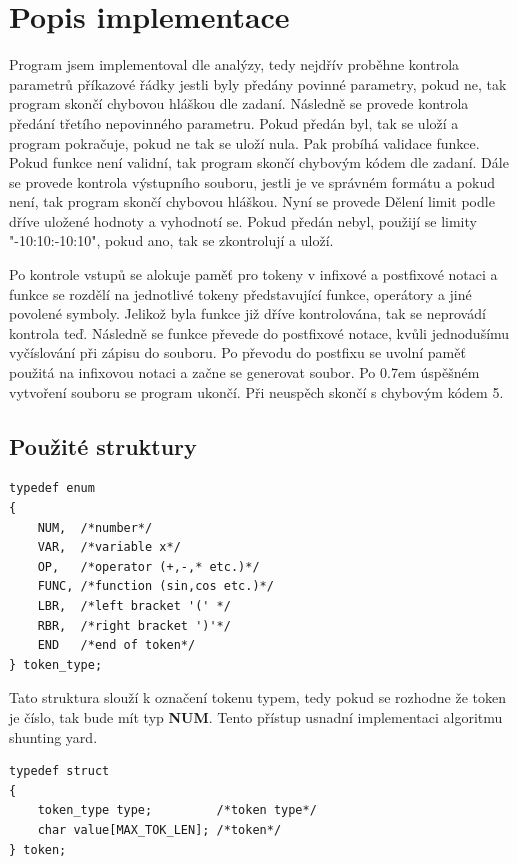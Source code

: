 \documentclass[../main.tex]{subfiles}
\begin{document}
\section{Popis implementace}
Program jsem implementoval dle analýzy, tedy nejdřív proběhne kontrola parametrů příkazové řádky jestli byly předány povinné parametry, pokud ne, tak program skončí chybovou hláškou dle zadaní.  Následně se provede kontrola předání třetího nepovinného parametru. Pokud předán byl, tak se uloží a program pokračuje, pokud ne tak se uloží nula. Pak probíhá validace funkce. Pokud funkce není validní, tak program skončí chybovým kódem dle zadaní. Dále se provede kontrola výstupního souboru, jestli je ve správném formátu a pokud není, tak program skončí chybovou hláškou. Nyní se provede Dělení limit podle dříve uložené hodnoty a vyhodnotí se. Pokud předán nebyl, použijí se limity "-10:10:-10:10", pokud ano, tak se zkontrolují a uloží.
\vspace{0.5em}

Po kontrole vstupů se alokuje paměť pro tokeny v infixové a postfixové notaci a funkce se rozdělí na jednotlivé tokeny představující funkce, operátory a jiné povolené symboly. Jelikož byla funkce již dříve kontrolována, tak se neprovádí kontrola teď. Následně se funkce převede do postfixové notace, kvůli jednodušímu vyčíslování při zápisu do souboru. Po převodu do postfixu se uvolní paměť použitá na infixovou notaci a začne se generovat soubor. Po
{
\spaceskip  0.7em  \relax
úspěšném vytvoření souboru se program ukončí. Při neuspěch skončí} 
\newline s chybovým kódem 5. 
\subsection{Použité struktury}
\begin{lstlisting}
typedef enum
{
    NUM,  /*number*/
    VAR,  /*variable x*/
    OP,   /*operator (+,-,* etc.)*/
    FUNC, /*function (sin,cos etc.)*/
    LBR,  /*left bracket '(' */
    RBR,  /*right bracket ')'*/
    END   /*end of token*/
} token_type;
\end{lstlisting}

Tato struktura slouží k označení tokenu typem, tedy pokud se rozhodne že token je číslo, tak bude mít typ \textbf{NUM}. Tento přístup usnadní implementaci algoritmu shunting yard.
\newpage
\begin{lstlisting}
typedef struct
{
    token_type type;         /*token type*/
    char value[MAX_TOK_LEN]; /*token*/
} token;
\end{lstlisting}
\end{document}
